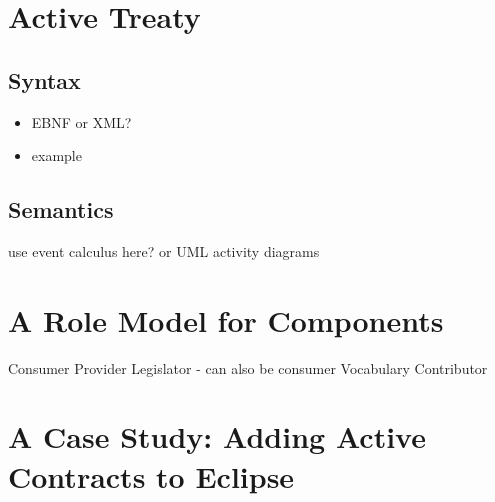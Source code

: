 \documentclass{llncs}
\begin{document}
\section{Active Treaty}

\subsection{Syntax}

\begin{itemize}
\item EBNF or XML?
\item example
\end{itemize}

\subsection{Semantics}

use event calculus here? or UML activity diagrams

\section{A Role Model for Components}

Consumer
Provider
Legislator - can also be consumer
Vocabulary Contributor


\section{A Case Study: Adding Active Contracts to Eclipse}

\section{}

 
  
  
    
\end{document}
